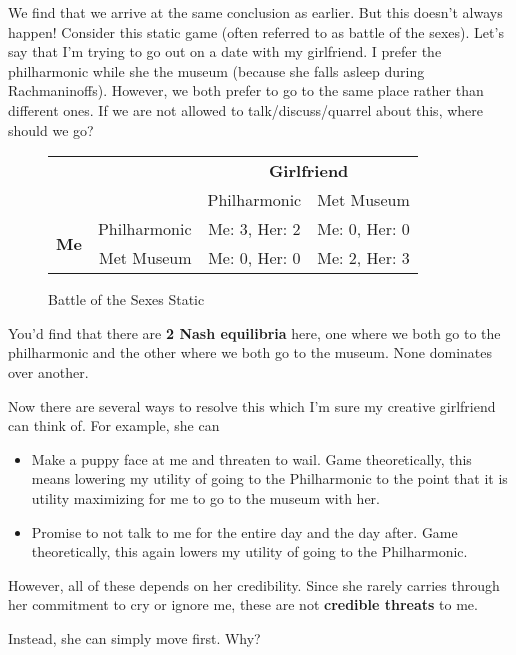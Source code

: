 \documentclass[11pt]{scrartcl}
\begin{document}
We find that we arrive at the same conclusion as earlier. But this doesn't always happen! Consider this static game (often referred to as battle of the sexes). Let's say that I'm trying to go out on a date with my girlfriend. I prefer the philharmonic while she the museum (because she falls asleep during Rachmaninoffs). However, we both prefer to go to the same place rather than different ones. If we are not allowed to talk/discuss/quarrel about this, where should we go?

\begin{figure}[H]
\centering
\begin{tabular}{rrcc}
& & \multicolumn{2}{c}{\textbf{Girlfriend}} \\
& & Philharmonic & Met Museum \\ 
\cline{3-4}
\multirow{2}{*}{\textbf{Me}} & \multicolumn{1}{c|}{Philharmonic} & \multicolumn{1}{c|}{Me: 3, Her: 2} & \multicolumn{1}{c|}{Me: 0, Her: 0} \\
\cline{3-4}
& \multicolumn{1}{r|}{Met Museum} & \multicolumn{1}{c|}{Me: 0, Her: 0} & \multicolumn{1}{c|}{Me: 2, Her: 3} \\
\cline{3-4}
\end{tabular}
\caption{Battle of the Sexes Static}
\end{figure}

You'd find that there are \textbf{2 Nash equilibria} here, one where we both go to the philharmonic and the other where we both go to the museum. None dominates over another.

Now there are several ways to resolve this which I'm sure my creative girlfriend can think of. For example, she can

\begin{itemize}
\item Make a puppy face at me and threaten to wail. Game theoretically, this means lowering my utility of going to the Philharmonic to the point that it is utility maximizing for me to go to the museum with her. 
\item Promise to not talk to me for the entire day and the day after. Game theoretically, this again lowers my utility of going to the Philharmonic.
\end{itemize}

However, all of these depends on her credibility. Since she rarely carries through her commitment to cry or ignore me, these are not \textbf{credible threats} to me. 

Instead, she can simply move first. Why?
\end{document}
